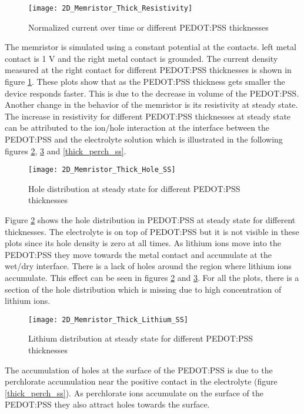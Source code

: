 \begin{doublespace}
\begin{figure}[!htp]
\centering
\texttt{[image: 2D\_Memristor\_Thick\_Resistivity]}
\caption{Normalized current over time or different PEDOT:PSS thicknesses} 
\label{thick_resistivity}
\end{figure}

The memristor is simulated using a constant potential at the contacts.  left metal contact is  1 V and the right metal contact is grounded. The current density measured at the right contact for different PEDOT:PSS thicknesses is shown in figure \ref{thick_resistivity}. These plots show that as the PEDOT:PSS thickness gets smaller the device responds faster. This is due to the decrease in volume of the PEDOT:PSS. Another change in the behavior of the memristor is its resistivity at steady state. The increase in resistivity for different PEDOT:PSS thicknesses at steady state can be attributed to the ion/hole interaction at the interface between the PEDOT:PSS and the electrolyte solution which is illustrated in the following figures \ref{thick_p_ss}, \ref{thick_li_ss} and \ref{thick_perch_ss}.

\begin{figure}[!htp]
\centering
\texttt{[image: 2D\_Memristor\_Thick\_Hole\_SS]}
\caption{Hole distribution at steady state for different PEDOT:PSS thicknesses} 
\label{thick_p_ss}
\end{figure}

Figure \ref{thick_p_ss} shows the hole distribution in PEDOT:PSS at steady state for different thicknesses. The electrolyte is on top of PEDOT:PSS but it is not visible in these plots since its hole density is zero at all times. As lithium ions move into the PEDOT:PSS they move towards the metal contact and accumulate at the wet/dry interface. There is a lack of holes around the region where lithium ions accumulate. This effect can be seen in figures \ref{thick_p_ss} and  \ref{thick_li_ss}. For all the plots, there is a section of the hole distribution which is missing due to high concentration of lithium ions.

\begin{figure}[!htp]
\centering
\texttt{[image: 2D\_Memristor\_Thick\_Lithium\_SS]}
\caption{Lithium distribution at steady state for different PEDOT:PSS thicknesses} 
\label{thick_li_ss}
\end{figure}

The accumulation of holes at the surface of the PEDOT:PSS is due to the perchlorate accumulation near the positive contact in the electrolyte (figure \ref{thick_perch_ss}). As perchlorate ions accumulate on the surface of the PEDOT:PSS they also attract holes towards the surface.


\end{doublespace}
